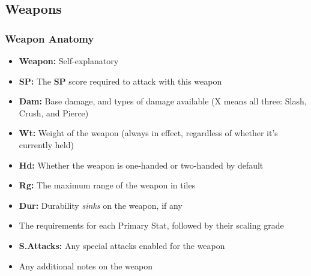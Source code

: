 \subsection{Weapons}
\subsubsection*{Weapon Anatomy}
\begin{itemize}
\item \textbf{Weapon:} Self-explanatory
\item \textbf{SP:} The \textbf{SP} score required to attack with this weapon
\item \textbf{Dam:} Base damage, and types of damage available (X means all three: Slash, Crush, and Pierce)
\item \textbf{Wt:} Weight of the weapon (always in effect, regardless of whether it’s currently held)
\item \textbf{Hd:} Whether the weapon is one-handed or two-handed by default
\item \textbf{Rg:} The maximum range of the weapon in tiles
\item \textbf{Dur:} Durability \emph{sinks} on the weapon, if any
\item The requirements for each Primary Stat, followed by their scaling grade
\item \textbf{S.Attacks:} Any special attacks enabled for the weapon
\item Any additional notes on the weapon
\end{itemize}


